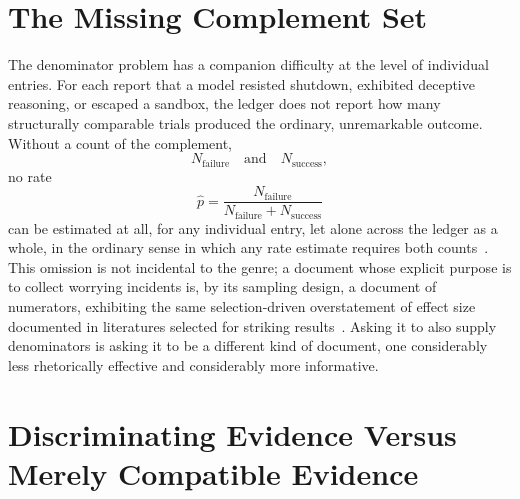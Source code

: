 \documentclass[11pt]{article}
\begin{document}
\section{The Missing Complement Set}

The denominator problem has a companion difficulty at the level of individual entries. For each report that a model resisted shutdown, exhibited deceptive reasoning, or escaped a sandbox, the ledger does not report how many structurally comparable trials produced the ordinary, unremarkable outcome. Without a count of the complement,
\[
N_{\text{failure}} \quad \text{and} \quad N_{\text{success}},
\]
no rate
\[
\hat{p} = \frac{N_{\text{failure}}}{N_{\text{failure}} + N_{\text{success}}}
\]
can be estimated at all, for any individual entry, let alone across the ledger as a whole, in the ordinary sense in which any rate estimate requires both counts~\cite{gelman2013}. This omission is not incidental to the genre; a document whose explicit purpose is to collect worrying incidents is, by its sampling design, a document of numerators, exhibiting the same selection-driven overstatement of effect size documented in literatures selected for striking results~\cite{ioannidis2005}. Asking it to also supply denominators is asking it to be a different kind of document, one considerably less rhetorically effective and considerably more informative.

\section{Discriminating Evidence Versus Merely Compatible Evidence}
\end{document}
